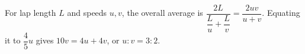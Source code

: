 For lap length $L$ and speeds $u,v$, the overall average is $\dfrac{2L}{\dfrac{L}{u}+\dfrac{L}{v}}=\dfrac{2uv}{u+v}$. Equating it to $\dfrac{4}{5}u$ gives $10v=4u+4v$, or $\boxed{u:v=3:2}$.

